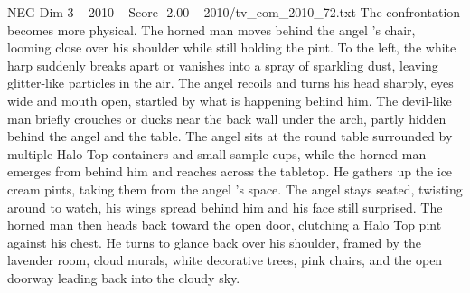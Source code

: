 \begin{textsample}{NEG Dim 3 – 2010 – Score -2.00 – 2010/tv\_com\_2010\_72.txt}
The confrontation becomes more physical.
The horned man moves behind the angel ’s chair, looming close over his shoulder while still holding the pint.
To the left, the white harp suddenly breaks apart or vanishes into a spray of sparkling dust, leaving glitter-like particles in the air.
The angel recoils and turns his head sharply, eyes wide and mouth open, startled by what is happening behind him.
The devil-like man briefly crouches or ducks near the back wall under the arch, partly hidden behind the angel and the table.
The angel sits at the round table surrounded by multiple Halo Top containers and small sample cups, while the horned man emerges from behind him and reaches across the tabletop.
He gathers up the ice cream pints, taking them from the angel ’s space.
The angel stays seated, twisting around to watch, his wings spread behind him and his face still surprised.
The horned man then heads back toward the open door, clutching a Halo Top pint against his chest.
He turns to glance back over his shoulder, framed by the lavender room, cloud murals, white decorative trees, pink chairs, and the open doorway leading back into the cloudy sky.

\end{textsample}
